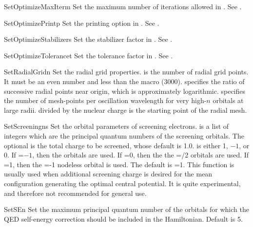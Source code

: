 \begin{fundesc}{SetOptimizeMaxIter}{m}
Set the maximum number of iterations allowed in . See
.
\end{fundesc}

\begin{fundesc}{SetOptimizePrint}{p}
Set the printing option in . See
.
\end{fundesc}

\begin{fundesc}{SetOptimizeStabilizer}{s}
Set the stabilizer factor in . See
.
\end{fundesc}

\begin{fundesc}{SetOptimizeTolerance}{t}
Set the tolerance factor in . See
.
\end{fundesc}

\begin{fundesc}{SetRadialGrid}{n}
Set the radial grid properties.  is the number of radial grid points. It
must be an even number and less than the macro  (3000). 
specifies the ratio of successive radial points near  origin, which is
approximately logarithmic.  specifies the number of mesh-points per
oscillation wavelength for very high-$n$ orbitals at large  radii. 
divided by the nuclear charge is the starting point of the radial mesh.
\end{fundesc}

\begin{fundesc}{SetScreening}{ns}
Set the orbital parameters of screening electrons.  is a list of
integers which are the principal quantum numbers of the screening
orbitals. The optional  is the total charge to be screened, whose
default is 1.0.  is either 1, $-1$, or 0. If =$-1$, then
the  orbitals are used. If =0, then the the =/2
orbitals are used. If =1, then the =-1 nodeless orbital
is used. The default is =1. This function is usually used when
additional screening charge is desired for the mean configuration generating
the optimal central potential. It is quite experimental, and therefore not
recommended for general use.
\end{fundesc}

\begin{fundesc}{SetSE}{n}
Set the maximum principal quantum number of the orbitals for which the QED
self-energy correction should be included in the Hamiltonian. Default is 5.
\end{fundesc}

